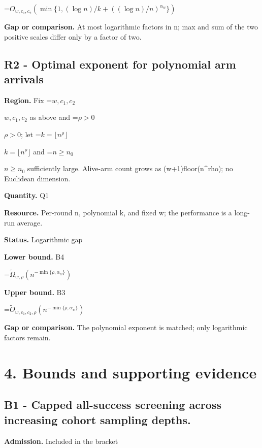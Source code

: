 \documentclass[10pt,a4paper]{article}
\newcommand{\AtlasMath}[1]{\par\begingroup\centering\setbox0=\hbox{$\displaystyle #1$}\ifdim\wd0>1.4\linewidth\typeout{ATLAS WIDE FORMULA: \the\wd0}\fi\ifdim\wd0>\linewidth\resizebox{\linewidth}{!}{\box0}\else\box0\fi\par\endgroup}
\newcommand{\AtlasInlineMath}[1]{\begingroup\setbox0=\hbox{$#1$}\ifdim\wd0>.4\linewidth\endgroup\AtlasMath{#1}\else\endgroup$#1$\fi}
\begin{document}
\AtlasMath{O_{w,c_1,c_2}\!\left(\min\{1,(\log n)/k+((\log n)/n)^{\alpha_w}\}\right)}


\textbf{Gap or comparison.} At most logarithmic factors in n; max and sum of the two positive scales differ only by a factor of two.



\subsection{R2 - Optimal exponent for polynomial arm arrivals}


\textbf{Region.} Fix \AtlasInlineMath{w,c_1,c_2} as above and \AtlasInlineMath{\rho>0}; let \AtlasInlineMath{k=\lfloor n^\rho\rfloor} and \AtlasInlineMath{n\ge n_0} sufficiently large. Alive-arm count grows as (w+1)floor(n\textasciicircum{}rho); no Euclidean dimension.



\textbf{Quantity.} Q1



\textbf{Resource.} Per-round n, polynomial k, and fixed w; the performance is a long-run average.



\textbf{Status.} Logarithmic gap



\textbf{Lower bound.} B4



\AtlasMath{\widetilde\Omega_{w,\rho}(n^{-\min\{\rho,\alpha_w\}})}


\textbf{Upper bound.} B3



\AtlasMath{\widetilde O_{w,c_1,c_2,\rho}(n^{-\min\{\rho,\alpha_w\}})}


\textbf{Gap or comparison.} The polynomial exponent is matched; only logarithmic factors remain.



\section{4. Bounds and supporting evidence}


\subsection{B1 - Capped all-success screening across increasing cohort sampling depths.}


\textbf{Admission.} Included in the bracket
\end{document}
